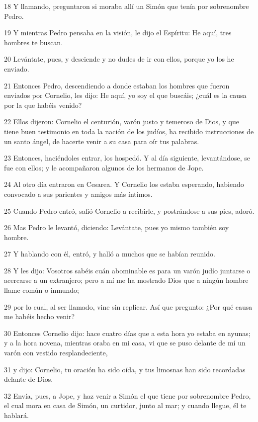 \par 18 Y llamando, preguntaron si moraba allí un Simón que tenía por sobrenombre Pedro.
\par 19 Y mientras Pedro pensaba en la visión, le dijo el Espíritu: He aquí, tres hombres te buscan.
\par 20 Levántate, pues, y desciende y no dudes de ir con ellos, porque yo los he enviado.
\par 21 Entonces Pedro, descendiendo a donde estaban los hombres que fueron enviados por Cornelio, les dijo: He aquí, yo soy el que buscáis; ¿cuál es la causa por la que habéis venido?
\par 22 Ellos dijeron: Cornelio el centurión, varón justo y temeroso de Dios, y que tiene buen testimonio en toda la nación de los judíos, ha recibido instrucciones de un santo ángel, de hacerte venir a su casa para oír tus palabras.
\par 23 Entonces, haciéndoles entrar, los hospedó. Y al día siguiente, levantándose, se fue con ellos; y le acompañaron algunos de los hermanos de Jope.
\par 24 Al otro día entraron en Cesarea. Y Cornelio los estaba esperando, habiendo convocado a sus parientes y amigos más íntimos.
\par 25 Cuando Pedro entró, salió Cornelio a recibirle, y postrándose a sus pies, adoró.
\par 26 Mas Pedro le levantó, diciendo: Levántate, pues yo mismo también soy hombre.
\par 27 Y hablando con él, entró, y halló a muchos que se habían reunido.
\par 28 Y les dijo: Vosotros sabéis cuán abominable es para un varón judío juntarse o acercarse a un extranjero; pero a mí me ha mostrado Dios que a ningún hombre llame común o inmundo;
\par 29 por lo cual, al ser llamado, vine sin replicar. Así que pregunto: ¿Por qué causa me habéis hecho venir?
\par 30 Entonces Cornelio dijo: hace cuatro días que a esta hora yo estaba en ayunas; y a la hora novena, mientras oraba en mi casa, vi que se puso delante de mí un varón con vestido resplandeciente,
\par 31 y dijo: Cornelio, tu oración ha sido oída, y tus limosnas han sido recordadas delante de Dios.
\par 32 Envía, pues, a Jope, y haz venir a Simón el que tiene por sobrenombre Pedro, el cual mora en casa de Simón, un curtidor, junto al mar; y cuando llegue, él te hablará.
